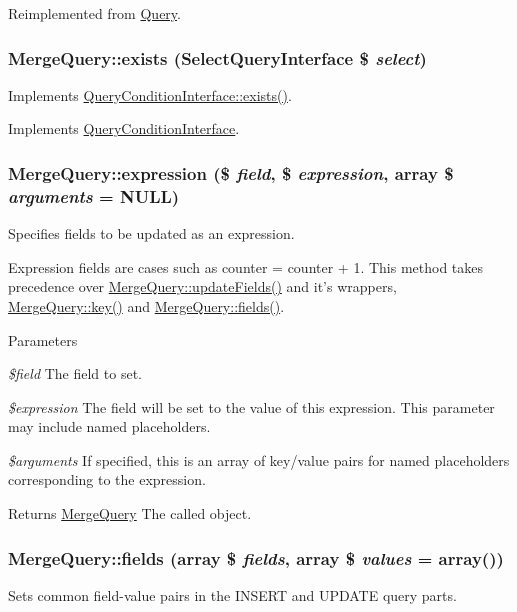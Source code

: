 Reimplemented from \hyperlink{classQuery_a9f2326187a94f3337a7838687b1e6929}{Query}.\hypertarget{classMergeQuery_a0a92a08ad6933ecc4a796e9d50ea85f5}{
\subsubsection[{exists}]{\setlength{\rightskip}{0pt plus 5cm}MergeQuery::exists ({\bf SelectQueryInterface} \$ {\em select})}}
\label{classMergeQuery_a0a92a08ad6933ecc4a796e9d50ea85f5}
Implements \hyperlink{interfaceQueryConditionInterface_a27a52b6e84393275ad2c54eaf1bd764a}{QueryConditionInterface::exists()}. 

Implements \hyperlink{interfaceQueryConditionInterface_a27a52b6e84393275ad2c54eaf1bd764a}{QueryConditionInterface}.\hypertarget{classMergeQuery_a09f35077e2adc871dcdd75efedbeabe0}{
\subsubsection[{expression}]{\setlength{\rightskip}{0pt plus 5cm}MergeQuery::expression (\$ {\em field}, \/  \$ {\em expression}, \/  array \$ {\em arguments} = {\ttfamily NULL})}}
\label{classMergeQuery_a09f35077e2adc871dcdd75efedbeabe0}
Specifies fields to be updated as an expression.

Expression fields are cases such as counter = counter + 1. This method takes precedence over \hyperlink{classMergeQuery_ad5b51b48eaec3821181cf8e6c09bf29e}{MergeQuery::updateFields()} and it's wrappers, \hyperlink{classMergeQuery_aa34f8ac97b0571d49fbc20557dfce97b}{MergeQuery::key()} and \hyperlink{classMergeQuery_ae58f2865c72dfc4c310ec4c17fd4e72d}{MergeQuery::fields()}.


\begin{DoxyParams}{Parameters}
\item[{\em \$field}]The field to set. \item[{\em \$expression}]The field will be set to the value of this expression. This parameter may include named placeholders. \item[{\em \$arguments}]If specified, this is an array of key/value pairs for named placeholders corresponding to the expression.\end{DoxyParams}
\begin{DoxyReturn}{Returns}
\hyperlink{classMergeQuery}{MergeQuery} The called object. 
\end{DoxyReturn}
\hypertarget{classMergeQuery_ae58f2865c72dfc4c310ec4c17fd4e72d}{
\subsubsection[{fields}]{\setlength{\rightskip}{0pt plus 5cm}MergeQuery::fields (array \$ {\em fields}, \/  array \$ {\em values} = {\ttfamily array()})}}
\label{classMergeQuery_ae58f2865c72dfc4c310ec4c17fd4e72d}
Sets common field-\/value pairs in the INSERT and UPDATE query parts.

